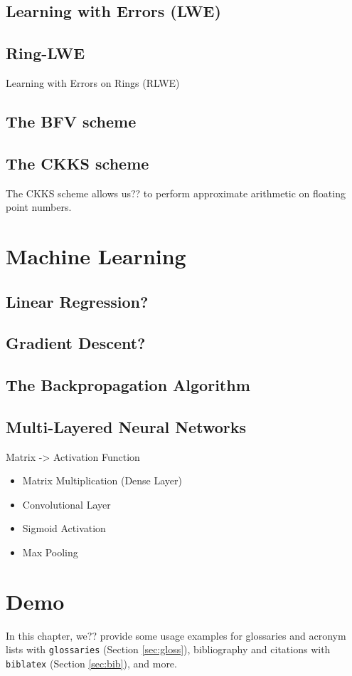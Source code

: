 \subsection{Learning with Errors (LWE)}

\subsection{Ring-LWE}
Learning with Errors on Rings (RLWE)

\subsection{The BFV scheme}
\subsection{The CKKS scheme}
The CKKS scheme allows us?? to perform approximate arithmetic on floating point numbers.

\section{Machine Learning}
\subsection{Linear Regression?}
\subsection{Gradient Descent?}
\subsection{The Backpropagation Algorithm}
\subsection{Multi-Layered Neural Networks}
Matrix -> Activation Function
\begin{itemize}
    \item Matrix Multiplication (Dense Layer)
    \item Convolutional Layer
    \item Sigmoid Activation
    \item Max Pooling
\end{itemize}

\section{Demo}
In this chapter, we?? provide some usage examples for
glossaries and acronym lists with \texttt{glossaries} (Section \ref{sec:gloss}),
bibliography and citations with \texttt{biblatex} (Section \ref{sec:bib}), and more.

